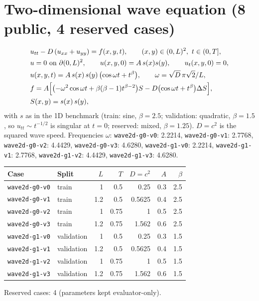 \documentclass[11pt]{article}
\begin{document}
\section{Two-dimensional wave equation (8 public, 4 reserved cases)}
\begin{align*}
&u_{tt} - D\,(u_{xx}+u_{yy}) = f(x,y,t),\qquad (x,y)\in(0,L)^2,\ t\in(0,T],\\
&u = 0 \text{ on } \partial(0,L)^2,\qquad u(x,y,0)=A\,s(x)s(y),\qquad u_t(x,y,0)=0,\\
&u(x,y,t) = A\,s(x)\,s(y)\,\bigl(\cos\omega t + t^{\beta}\bigr),\qquad \omega=\sqrt{D}\,\pi\sqrt{2}/L,\\
&f = A\Bigl[\bigl(-\omega^2\cos\omega t+\beta(\beta-1)t^{\beta-2}\bigr)S
   - D\bigl(\cos\omega t+t^{\beta}\bigr)\Delta S\Bigr],\\
&S(x,y)=s(x)\,s(y),
\end{align*}
with $s$ as in the 1D benchmark (train: sine, $\beta=2.5$; validation: quadratic, $\beta=1.5$, so
$u_{tt}\sim t^{-1/2}$ is singular at $t=0$; reserved: mixed, $\beta=1.25$). $D=c^2$ is the squared wave speed.
\noindent Frequencies $\omega$: \texttt{wave2d-g0-v0}: 2.2214, \texttt{wave2d-g0-v1}: 2.7768, \texttt{wave2d-g0-v2}: 4.4429, \texttt{wave2d-g0-v3}: 4.6280, \texttt{wave2d-g1-v0}: 2.2214, \texttt{wave2d-g1-v1}: 2.7768, \texttt{wave2d-g1-v2}: 4.4429, \texttt{wave2d-g1-v3}: 4.6280.

\begin{center}\small
\begin{tabular}{llrrrrr}
\toprule
Case & Split & $L$ & $T$ & $D=c^2$ & $A$ & $\beta$ \\
\midrule
\texttt{wave2d-g0-v0} & train & 1 & 0.5 & 0.25 & 0.3 & 2.5 \\
\texttt{wave2d-g0-v1} & train & 1.2 & 0.5 & 0.5625 & 0.4 & 2.5 \\
\texttt{wave2d-g0-v2} & train & 1 & 0.75 & 1 & 0.5 & 2.5 \\
\texttt{wave2d-g0-v3} & train & 1.2 & 0.75 & 1.562 & 0.6 & 2.5 \\
\texttt{wave2d-g1-v0} & validation & 1 & 0.5 & 0.25 & 0.3 & 1.5 \\
\texttt{wave2d-g1-v1} & validation & 1.2 & 0.5 & 0.5625 & 0.4 & 1.5 \\
\texttt{wave2d-g1-v2} & validation & 1 & 0.75 & 1 & 0.5 & 1.5 \\
\texttt{wave2d-g1-v3} & validation & 1.2 & 0.75 & 1.562 & 0.6 & 1.5 \\
\bottomrule
\end{tabular}
\end{center}
\noindent Reserved cases: 4 (parameters kept evaluator-only).
\end{document}

